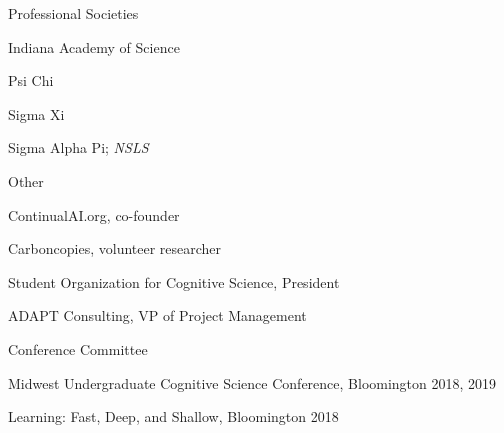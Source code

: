 \newpage
{}
\begin{cventries}


  \cventry
    {Professional Societies} %
    {} %
    {} %
    {} %
    {
      \begin{cvitems} %
        \item {Indiana Academy of Science}
	\item{Psi Chi}
	\item{Sigma Xi}
	\item{Sigma Alpha Pi; \textit{NSLS}}
      \end{cvitems}
    }

  \cventry
    {Other} %
    {} %
    {} %
    {} %
    {
      \begin{cvitems} %
        \item {ContinualAI.org, co-founder}
	\item {Carboncopies, volunteer researcher}
	\item {Student Organization for Cognitive Science, President}
	\item {ADAPT Consulting, VP of Project Management}
      \end{cvitems}
    }

 \cventry
    {Conference Committee} %
    {} %
    {} %
    {} %
    {
      \begin{cvitems} %
        \item {Midwest Undergraduate Cognitive Science Conference, Bloomington 2018, 2019}
	\item{Learning: Fast, Deep, and Shallow, Bloomington 2018}
      \end{cvitems}
    }
\end{cventries}
